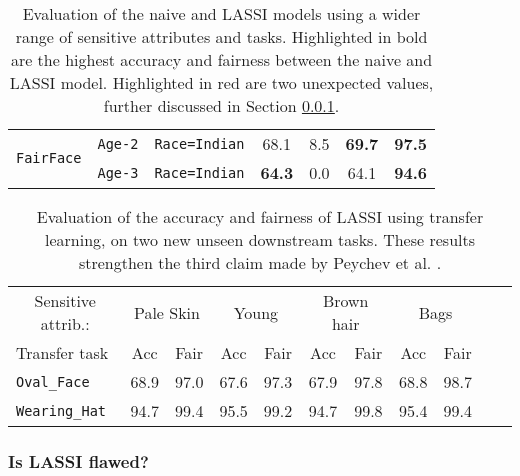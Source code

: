 \begin{table}[H]
\begin{tabular}{lllcccc}
\cmidrule(rl){1-3} \cmidrule(rl){4-5} \cmidrule(rl){6-7}
\multirow{2}{*}{\texttt{FairFace}} & {\texttt{Age-2}} & \texttt{Race=Indian} & 68.1 & 8.5 & \textbf{69.7} & \textbf{97.5} \\
& \texttt{Age-3} &  \texttt{Race=Indian} & \textbf{64.3} & 0.0 & 64.1 & \textbf{94.6} \\
\bottomrule
\end{tabular}
\caption{\label{tab:new_results} Evaluation of the naive and LASSI models using a wider range of sensitive attributes and tasks. Highlighted in bold are the highest accuracy and fairness between the naive and LASSI model. Highlighted in red are two unexpected values, further discussed in Section \ref{subsec:vis}.}
\end{table}

\begin{table}[H]
\small
\centering
\begin{tabular}{lcccccccccc}
\toprule
\multicolumn{1}{c}{Sensitive attrib.:} & \multicolumn{2}{c}{Pale Skin} & \multicolumn{2}{c}{Young}  & \multicolumn{2}{c}{Brown hair} & \multicolumn{2}{c}{Bags} \\
\cmidrule(rl){2-3} \cmidrule(rl){4-5} \cmidrule(rl){6-7} \cmidrule(rl){8-9}
Transfer task & Acc & Fair & Acc & Fair & Acc & Fair & Acc & Fair \\
\midrule
\texttt{Oval\_Face} & 68.9 & 97.0 & 67.6 & 97.3 & 67.9 & 97.8 & 68.8 & 98.7  \\
\texttt{Wearing\_Hat} & 94.7 & 99.4 & 95.5 & 99.2 & 94.7 & 99.8 & 95.4 & 99.4  \\
\bottomrule
\end{tabular}
\caption{\label{tab:new_results_translearning} Evaluation of the accuracy and fairness of LASSI using transfer learning, on two new unseen downstream tasks. These results strengthen the third claim made by Peychev et al. \cite{peychev2022latent}.}
\end{table}


\subsubsection{Is LASSI flawed?}\label{subsec:vis}

